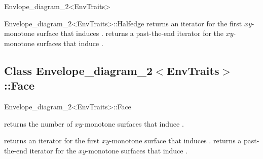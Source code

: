 \begin{ccRefClass}{Envlope_diagram_2<EnvTraits>}
\begin{ccClass}{Envelope_diagram_2<EnvTraits>::Halfedge}
{returns an iterator for the first $xy$-monotone surface that induces \ccVar.}
\ccGlue
{}
{returns a past-the-end iterator for the $xy$-monotone surfaces that induce
 \ccVar.}

\end{ccClass}


\subsection*{Class Envelope\_diagram\_2$<$EnvTraits$>$::Face}

\begin{ccClass}{Envelope_diagram_2<EnvTraits>::Face}

\ccInheritsFrom

\ccAccessFunctions

{returns the number of $xy$-monotone surfaces that induce \ccVar.}

{returns an iterator for the first $xy$-monotone surface that induces \ccVar.}
\ccGlue
{}
{returns a past-the-end iterator for the $xy$-monotone surfaces that induce
 \ccVar.}

\end{ccClass}


\end{ccRefClass}

\ccRefPageEnd


